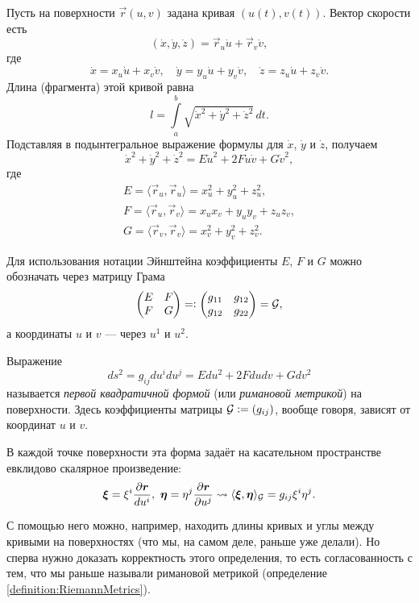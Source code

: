 Пусть на поверхности $\vec{r}(u, v)$ задана кривая $(u(t), v(t))$. Вектор скорости есть
\[
	(\dot{x}, \dot{y}, \dot{z}) = \vec{r}_u\dot{u} + \vec{r}_v\dot{v},
\]
где
\[
	\dot{x} = x_u\dot{u} + x_v\dot{v},\quad
	\dot{y} = y_u\dot{u} + y_v\dot{v},\quad
	\dot{z} = z_u\dot{u} + z_v\dot{v}.
\]
Длина (фрагмента) этой кривой равна
\[
	l = \int\limits_a^b\sqrt{\dot{x}^2 + \dot{y}^2 + \dot{z}^2}\,dt.
\]
Подставляя в подынтегральное выражение формулы для $\dot{x}$, $\dot{y}$ и $\dot{z}$, получаем
\[
	\dot{x}^2 + \dot{y}^2 + \dot{z}^2 = E\dot{u}^2 + 2F\dot{u}\dot{v} + G\dot{v}^2,
\]
где
\begin{gather*}
	E = \langle\vec{r}_u, \vec{r}_u\rangle = x_u^2 + y_u^2 + z_u^2,\\
	F = \langle\vec{r}_u, \vec{r}_v\rangle = x_ux_v + y_uy_v + z_uz_v,\\
	G = \langle\vec{r}_v, \vec{r}_v\rangle = x_v^2 + y_v^2 + z_v^2.
\end{gather*}

Для использования нотации Эйнштейна коэффициенты $E$, $F$ и $G$ можно обозначать через матрицу Грама
\[
	\begin{pmatrix}
		E & F\\
		F & G
	\end{pmatrix} = \vcentcolon
	\begin{pmatrix}
		g_{11} & g_{12}\\
		g_{12} & g_{22}
	\end{pmatrix} = \mathcal{G},
\]
а координаты $u$ и $v$ --- через $u^1$ и $u^2$.

\begin{definition}
	Выражение
	\[
		ds^2 = g_{ij}du^idu^j = Edu^2 + 2Fdudv + Gdv^2
	\]
	называется \textit{первой квадратичной формой} (или \textit{римановой метрикой}) на поверхности. Здесь коэффициенты матрицы $\mathcal{G} \vcentcolon = (g_{ij})$, вообще говоря, зависят от координат $u$ и $v$.
\end{definition}

В каждой точке поверхности эта форма задаёт на касательном пространстве евклидово скалярное произведение:
\[
	\vec{\xi} = \xi^i\frac{\partial \vec{r}}{du^i},\ \vec{\eta} = \eta^j\frac{\partial \vec{r}}{\partial u^j} \leadsto \langle\vec{\xi}, \vec{\eta}\rangle_\G = g_{ij}\xi^i\eta^j.
\]

С помощью него можно, например, находить длины кривых и углы между кривыми на поверхностях (что мы, на самом деле, раньше уже делали). Но сперва нужно доказать корректность этого определения, то есть согласованность с тем, что мы раньше называли римановой метрикой (определение \ref{definition:RiemannMetrics}).


